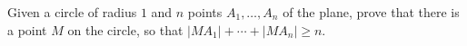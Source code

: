Given a circle of radius $1$ and $n$ points $A_1, \ldots, A_n$ of the plane, prove that there is a point $M$ on the circle, so that $|MA_1| + \cdots + |MA_n| \geq n$.
